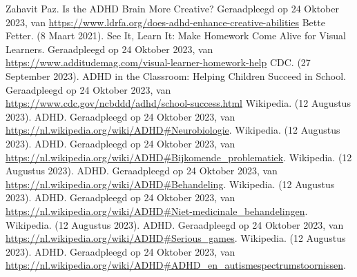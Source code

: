 \documentclass{article}
\begin{document}
\begin{thebibliography}{9}
                Zahavit Paz. Is the ADHD Brain More Creative? Geraadpleegd op 24 Oktober 2023, van \url{https://www.ldrfa.org/does-adhd-enhance-creative-abilities}
                Bette Fetter. (8 Maart 2021). See It, Learn It: Make Homework Come Alive for Visual Learners. Geraadpleegd op 24 Oktober 2023, van \url{https://www.additudemag.com/visual-learner-homework-help}
                CDC. (27 September 2023). ADHD in the Classroom: Helping Children Succeed in School. Geraadpleegd op 24 Oktober 2023, van \url{https://www.cdc.gov/ncbddd/adhd/school-success.html}
                Wikipedia. (12 Augustus 2023). ADHD. Geraadpleegd op 24 Oktober 2023, van \url{https://nl.wikipedia.org/wiki/ADHD#Neurobiologie}.
                Wikipedia. (12 Augustus 2023). ADHD. Geraadpleegd op 24 Oktober 2023, van \url{https://nl.wikipedia.org/wiki/ADHD#Bijkomende_problematiek}.
                Wikipedia. (12 Augustus 2023). ADHD. Geraadpleegd op 24 Oktober 2023, van \url{https://nl.wikipedia.org/wiki/ADHD#Behandeling}.
                Wikipedia. (12 Augustus 2023). ADHD. Geraadpleegd op 24 Oktober 2023, van \url{https://nl.wikipedia.org/wiki/ADHD#Niet-medicinale_behandelingen}.
                Wikipedia. (12 Augustus 2023). ADHD. Geraadpleegd op 24 Oktober 2023, van \url{https://nl.wikipedia.org/wiki/ADHD#Serious_games}.
                Wikipedia. (12 Augustus 2023). ADHD. Geraadpleegd op 24 Oktober 2023, van \url{https://nl.wikipedia.org/wiki/ADHD#ADHD_en_autismespectrumstoornissen}.
        \newpage     


\end{thebibliography}
\end{document}

